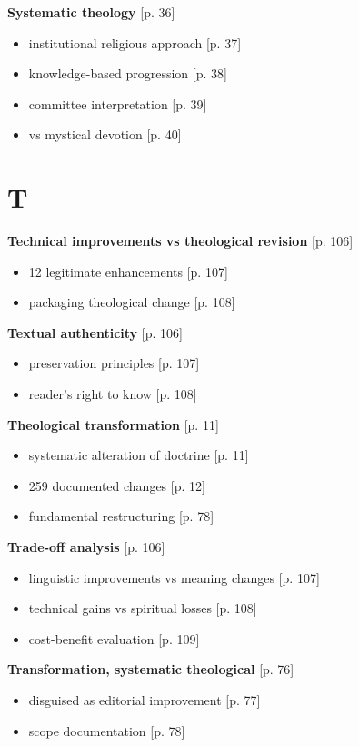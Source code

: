 \documentclass[11pt,twoside]{book}
\begin{document}
\textbf{\textbf{Systematic theology}} {[}p. 36]
\begin{itemize}
\item institutional religious approach [p. 37]
\item knowledge-based progression [p. 38]
\item committee interpretation [p. 39]
\item vs mystical devotion [p. 40]
\end{itemize}
\section*{T}
\label{sec:orga0ff8ff}

\textbf{\textbf{Technical improvements vs theological revision}} {[}p. 106]
\begin{itemize}
\item 12 legitimate enhancements [p. 107]
\item packaging theological change [p. 108]
\end{itemize}

\textbf{\textbf{Textual authenticity}} {[}p. 106]
\begin{itemize}
\item preservation principles [p. 107]
\item reader's right to know [p. 108]
\end{itemize}

\textbf{\textbf{Theological transformation}} {[}p. 11]
\begin{itemize}
\item systematic alteration of doctrine [p. 11]
\item 259 documented changes [p. 12]
\item fundamental restructuring [p. 78]
\end{itemize}

\textbf{\textbf{Trade-off analysis}} {[}p. 106]
\begin{itemize}
\item linguistic improvements vs meaning changes [p. 107]
\item technical gains vs spiritual losses [p. 108]
\item cost-benefit evaluation [p. 109]
\end{itemize}

\textbf{\textbf{Transformation, systematic theological}} {[}p. 76]
\begin{itemize}
\item disguised as editorial improvement [p. 77]
\item scope documentation [p. 78]
\end{itemize}
\end{document}
